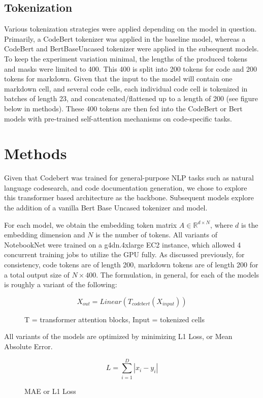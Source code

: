 \documentclass[conference]{IEEEtran}
\begin{document}
\subsection{Tokenization}
Various tokenization strategies were applied depending on the model in question. Primarily, a CodeBert tokenizer was applied in the baseline model, whereas a CodeBert and BertBaseUncased tokenizer were applied in the subsequent models. To keep the experiment variation minimal, the lengths of the produced tokens and masks were limited to 400. This 400 is split into 200 tokens for code and 200 tokens for markdown. Given that the input to the model will contain one markdown cell, and several code cells, each individual code cell is tokenized in batches of length 23, and concatenated/flattened up to a length of 200 (see figure below in methods). These 400 tokens are then fed into the CodeBert or Bert models with pre-trained self-attention mechanisms on code-specific tasks.

\section{Methods}

Given that Codebert was trained for general-purpose NLP tasks such as natural language codesearch, and code documentation generation, we chose to explore this transformer based architecture as the backbone. Subsequent models explore the addition of a vanilla Bert Base Uncased tokenizer and model.

For each model, we obtain the embedding token matrix $A \in \mathbb{R}^{d \times N}$, where $d$ is the embedding dimension and $N$ is the number of tokens. All variants of NotebookNet were trained on a g4dn.4xlarge EC2 instance, which allowed 4 concurrent training jobs to utilize the GPU fully. As discussed previously, for consistency, code tokens are of length 200, markdown tokens are of length 200 for a total output size of $N \times 400$. The formulation, in general, for each of the models is roughly a variant of the following:

\begin{figure}[h]
  \centering
  \[ X_{out} = Linear(T_{codebert}(X_{input})) \]
  \caption{T = transformer attention blocks, Input = tokenized cells}
\end{figure}

All variants of the models are optimized by minimizing L1 Loss, or Mean Absolute Error.

\begin{figure}[h]
  \centering
  \[ L=\sum_{i=1}^{D}|x_i-y_i| \]
  \caption{MAE or L1 Loss}
\end{figure}
\end{document}
